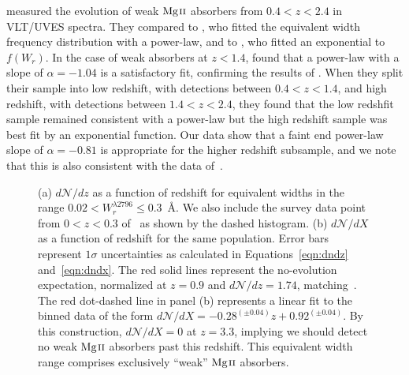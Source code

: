 \documentclass[iop,apj,numberedappendix,appendixfloats,twocolappendix]{emulateapj}
\begin{document}
\cite{Narayanan2007} measured the evolution of weak ${\hbox{{\rm Mg}\kern 0.1em{\sc ii}}}$ absorbers from $0.4 < z < 2.4$ in VLT/UVES spectra. They compared to \cite{Churchill1999}, who fitted the equivalent width frequency distribution with a power-law, and to \cite{Nestor2005}, who fitted an exponential to $f(W_r)$. In the case of weak absorbers at $z < 1.4$, \cite{Narayanan2007} found that a power-law with a slope of $\alpha = -1.04$ is a satisfactory fit, confirming the results of \cite{Churchill1999}. When they split their sample into low redshift, with detections between $0.4 < z < 1.4$, and high redshift, with detections between $1.4 < z < 2.4$, they found that the low redshfit sample remained consistent with a power-law but the high redshift sample was best fit by an exponential function. Our data show that a faint end power-law slope of $\alpha = -0.81$ is appropriate for the higher redshift subsample, and we note that this is also consistent with the data of~\cite{Narayanan2007}.

\begin{figure}[bth]
\caption{(a) $d\mathcal{N}\!/dz$ as a function of redshift for equivalent widths in the range $0.02 < W_{r}^{\lambda2796} \le 0.3$~{\AA}. We also include the survey data point from $0 < z < 0.3$ of~\cite{Narayanan2005} as shown by the dashed histogram. (b) $d\mathcal{N}\!/dX$ as a function of redshift for the same population. Error bars represent $1\sigma$ uncertainties as calculated in Equations~\ref{eqn:dndz} and~\ref{eqn:dndx}. The red solid lines represent the no-evolution expectation, normalized at $z = 0.9$ and $d\mathcal{N}\!/dz = 1.74$, matching~\cite{Narayanan2007}. The red dot-dashed line in panel (b) represents a linear fit to the binned data of the form $d\mathcal{N}\!/dX = -0.28^{(\pm0.04)}z + 0.92^{(\pm0.04)}$. By this construction, $d\mathcal{N}\!/dX = 0$ at $z = 3.3$, implying we should detect no weak ${\hbox{{\rm Mg}\kern 0.1em{\sc ii}}}$ absorbers past this redshift. This equivalent width range comprises exclusively ``weak'' ${\hbox{{\rm Mg}\kern 0.1em{\sc ii}}}$ absorbers.}
\label{fig:dndzbetween}
\end{figure}
\end{document}
